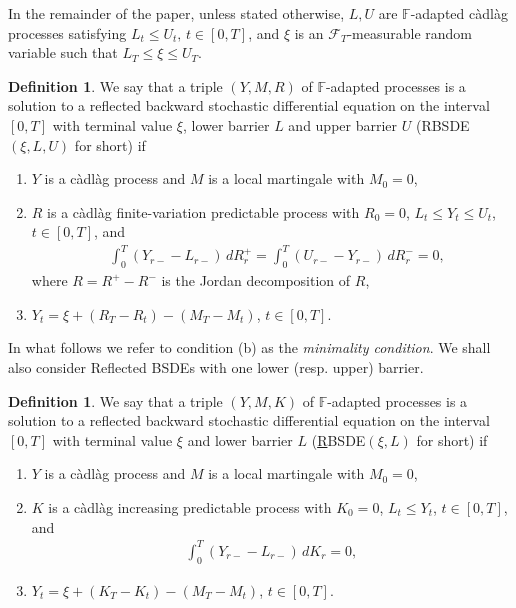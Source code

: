 \documentclass[11pt,a4paper,reqno]{amsart}
\theoremstyle{definition}
\newtheorem{definition}[theorem]{Definition}
\numberwithin{equation}{section}
\begin{document}
In the remainder of the paper, unless stated otherwise, $L,U$ are  $\mathbb F$-adapted c\`adl\`ag  processes 
satisfying  $L_t\le U_t,\, t\in [0,T]$, and  $\xi$ is an $\mathcal F_T$-measurable random variable
such that $L_T\le\xi\le U_T$.

\begin{definition}
\label{def.drbsde}
We say that a triple $(Y,M,R)$ of $\mathbb{F}$-adapted processes is a solution to  
a reflected backward stochastic differential equation
on the interval $[0,T]$ with  terminal value 
$\xi$, lower barrier $L$ and upper barrier $U$ (RBSDE$(\xi,L,U)$ for short) if
\begin{enumerate}
\item[(a)] $Y$ is a c\`adl\`ag process and $M$ is a local martingale with $M_0=0$,
\item[(b)] $R$ is a c\`adl\`ag finite-variation predictable process with $R_0=0$,
$L_t\le Y_t\le U_t$, $t\in[0,T]$, and
\begin{equation*}
\begin{split}
&\int^{T}_{0}(Y_{r-}-L_{r-})\,dR^{+}_r=\int^{T}_{0}(U_{r-}-Y_{r-})\,dR^{-}_r=0,
\end{split}
\end{equation*}
where $R=R^{+}-R^{-}$ is the Jordan decomposition of $R$,
\item[(c)] $Y_t=\xi+(R_T-R_t)-(M_T-M_t)$, $t\in[0,T]$.
\end{enumerate}
\end{definition}

In what follows we refer to condition (b) as the {\em minimality condition}.
We shall  also consider Reflected BSDEs with one  lower (resp. upper) barrier.

\begin{definition}
We say that a triple $(Y,M,K)$ of $\mathbb{F}$-adapted processes is a solution to  a
reflected backward stochastic differential equation
on the interval $[0,T]$ with  terminal value $\xi$ and lower barrier $L$ (\underline{R}BSDE$(\xi,L)$ for short) if
\begin{enumerate}
\item[(a)] $Y$ is a c\`adl\`ag process and $M$ is a local martingale with $M_0=0$,
\item[(b)] $K$ is a c\`adl\`ag increasing  predictable process with $K_0=0$, $L_t\le Y_t$, $t\in[0,T]$, and
\begin{equation*}
\begin{split}
\int^{T}_{0}(Y_{r-}-L_{r-})\,dK_r=0,
\end{split}
\end{equation*}
\item[(c)] $Y_t=\xi+(K_T-K_t)-(M_T-M_t)$, $t\in[0,T]$.
\end{enumerate}
\end{definition}
\end{document}
